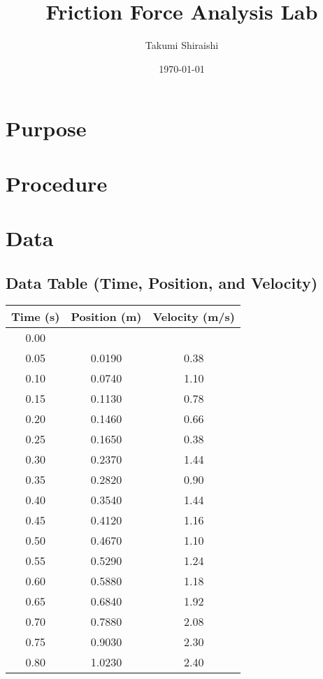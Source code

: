 \documentclass[12pt]{article}
\begin{document}

\title{Friction Force Analysis Lab}
\author{Takumi Shiraishi}
\date{\today}
\maketitle

\tableofcontents
\vspace{1cm}


\newpage
\section{Purpose}

\newpage
\section{Procedure}

\newpage
\section{Data}

\subsection{Data Table (Time, Position, and Velocity)}


\begin{center}
\begin{tabular}{|c|c|c|}
\hline
\textbf{Time (s)} & \textbf{Position (m)} & \textbf{Velocity (m/s)} \\ \hline
0.00 &  &  \\ \hline
0.05 & 0.0190 & 0.38 \\ \hline
0.10 & 0.0740 & 1.10 \\ \hline
0.15 & 0.1130 & 0.78 \\ \hline
0.20 & 0.1460 & 0.66 \\ \hline
0.25 & 0.1650 & 0.38 \\ \hline
0.30 & 0.2370 & 1.44 \\ \hline
0.35 & 0.2820 & 0.90 \\ \hline
0.40 & 0.3540 & 1.44 \\ \hline
0.45 & 0.4120 & 1.16 \\ \hline
0.50 & 0.4670 & 1.10 \\ \hline
0.55 & 0.5290 & 1.24 \\ \hline
0.60 & 0.5880 & 1.18 \\ \hline
0.65 & 0.6840 & 1.92 \\ \hline
0.70 & 0.7880 & 2.08 \\ \hline
0.75 & 0.9030 & 2.30 \\ \hline
0.80 & 1.0230 & 2.40 \\ \hline
\end{tabular}
\end{center}
\end{document}
